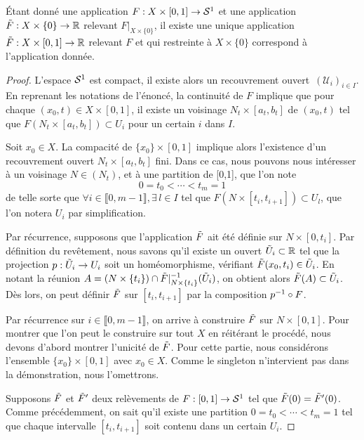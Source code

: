 \documentclass[hidelinks, 10pt]{article}
\begin{document}
\begin{lemma}\label{lemma:relevement}
Étant donné une application $F:X\times[0,1]\rightarrow\mathcal{S}^{1}$ et une application~$\Tilde{F}:X\times\{0\}\rightarrow\mathbb{R}$ relevant $F|_{X\times\{0\}}$, il existe une unique application~$\Tilde{F}:X\times[0,1]\rightarrow\mathbb{R}$ relevant $F$ et qui restreinte à $X\times\{0\}$ correspond à l'application donnée.
\end{lemma}
\begin{proof}
L'espace $\mathcal{S}^{1}$ est compact, il existe alors un recouvrement ouvert~$(\mathcal{U}_i)_{i\in I}$. En reprenant les notations de l'énoncé, la continuité de $F$ implique que pour chaque $(x_0,t)\in X\times[0,1]$, il existe un voisinage $N_t\times[a_t,b_t]$ de $(x_0,t)$ tel que $F(N_t\times[a_t,b_t])\subset U_i$ pour un certain $i$ dans $I$.

\bigskip Soit $x_0\in X$. La compacité de $\{x_0\}\times[0,1]$ implique alors l'existence d'un recouvrement ouvert $N_t\times[a_t,b_t]$ fini. Dans ce cas, nous pouvons nous intéresser à un voisinage $N\in(N_t)$, et à une partition de [0,1], que l'on note $$0=t_0<\cdots<t_m=1$$de telle sorte que  $\forall i\in\llbracket0,m-1\rrbracket,\exists\, l\in I$ tel que $F(N\times[t_i,t_{i+1}])\subset U_l$, que l'on notera $U_i$ par simplification.

\bigskip Par récurrence, supposons que l'application $\Tilde{F}$ ait été définie sur $N\times[0,t_i]$. Par définition du revêtement, nous savons qu'il existe un ouvert $\Tilde{U}_i\subset\mathbb{R}$ tel que la projection $p:\Tilde{U}_i\to U_i$ soit un homéomorphisme, vérifiant $\Tilde{F}(x_0,t_i)\in\Tilde{U}_i$. En notant la réunion $A=(N\times\{t_i\})\cap\Tilde{F}|_{N\times\{t_i\}}^{-1}(\Tilde{U}_i)$, on obtient alors $\Tilde{F}(A)\subset\Tilde{U}_i$. Dès lors, on peut définir $\Tilde{F}$ sur $[t_i,t_{i+1}]$ par la composition $p^{-1}\circ F$.

\bigskip Par récurrence sur $i\in\llbracket0,m-1\rrbracket$, on arrive à construire $\Tilde{F}$ sur $N\times[0,1]$. Pour montrer que l'on peut le construire sur tout $X$ en réitérant le procédé, nous devons d'abord montrer l'unicité de $\Tilde{F}$. Pour cette partie, nous considérons l'ensemble $\{x_0\}\times[0,1]$ avec $x_0\in X$. Comme le singleton n'intervient pas dans la démonstration, nous l'omettrons.

\bigskip Supposons $\Tilde{F}$ et $\Tilde{F}'$ deux relèvements de $F:[0,1]\to\mathcal{S}^{1}$ tel que $\Tilde{F}(0)=\Tilde{F}'(0)$. Comme précédemment, on sait qu'il existe une partition $0=t_0<\cdots<t_m=1$ tel que chaque intervalle $[t_i,t_{i+1}]$ soit contenu dans un certain $U_i$.


\end{proof}
\end{document}
